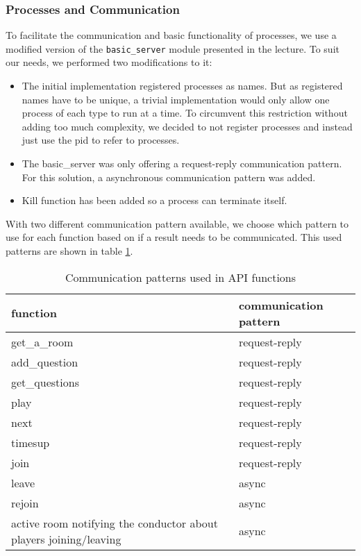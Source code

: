 \documentclass[11pt, a4paper]{article}
\begin{document}
\subsubsection{Processes and Communication}
To facilitate the communication and basic functionality of processes, we use a modified version of the \texttt{basic\_server} module presented in the lecture. To suit our needs, we performed two modifications to it:
\begin{itemize}
	\item The initial implementation registered processes as names. But as registered names have to be unique, a trivial implementation would only allow one process of each type to run at a time. To circumvent this restriction without adding too much complexity, we decided to not register processes and instead just use the pid to refer to processes.
	\item The basic\_server was only offering a request-reply communication pattern. For this solution, a asynchronous communication pattern was added. 
	\item Kill function has been added so a process can terminate itself. 
\end{itemize}

With two different communication pattern available, we choose which pattern to use for each function based on if a result needs to be communicated. This used patterns are shown in table \ref{tab1}.

\begin{table}[h!]
	\centering
	\caption{Communication patterns used in API functions}
	\label{tab1}
	\begin{tabular}{l|l}
		function                                                          & communication pattern \\ \hline
		get\_a\_room                                                      & request-reply         \\
		add\_question                                                     & request-reply         \\
		get\_questions                                                    & request-reply         \\
		play                                                              & request-reply         \\
		next                                                              & request-reply         \\
		timesup                                                           & request-reply         \\
		join                                                              & request-reply         \\
		leave                                                             & async                 \\
		rejoin                                                            & async                 \\
		active room notifying the conductor about players joining/leaving & async                
	\end{tabular}
\end{table}
\end{document}
